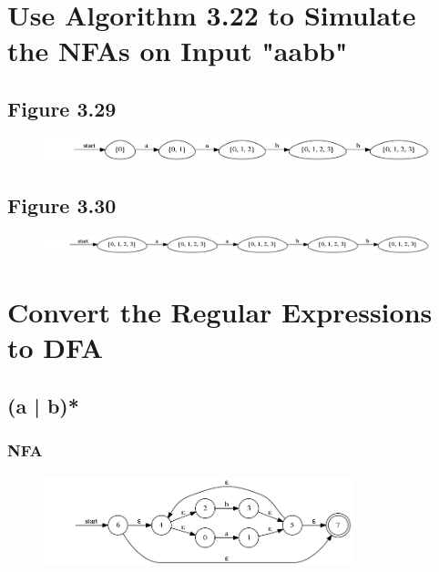 \documentclass[paper=a4, fontsize=11pt]{scrartcl} %
\numberwithin{equation}{section} %
\numberwithin{figure}{section} %
\numberwithin{table}{section} %
\begin{document}
\newpage
\section{Use Algorithm 3.22 to Simulate the NFAs on Input "aabb"}
\subsection*{Figure 3.29}
\begin{figure}[H]
\centering
\includegraphics[width=1.1\textwidth]{2_1.png}
\label{fig:2_1}
\end{figure}

\subsection*{Figure 3.30}
\begin{figure}[H]
\centering
\includegraphics[width=1.1\textwidth]{2_2.png}
\label{fig:2_2}
\end{figure}


\newpage
\section{Convert the Regular Expressions to DFA}
\subsection{(a | b)*}
\subsubsection*{NFA}
\begin{figure}[H]
\centering
\includegraphics[width=0.8\textwidth]{3_1_1.png}
\label{fig:3_1_1}
\end{figure}
\end{document}
